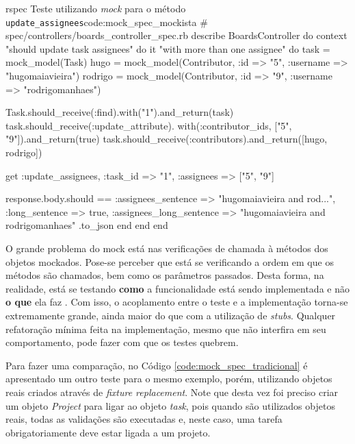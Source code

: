 \begin{mycode}{rspec}%
{Teste utilizando \textit{mock} para o método \texttt{update\_assignees}}{code:mock_spec_mockista}
# spec/controllers/boards_controller_spec.rb
describe BoardsController do
  context "should update task assignees" do
    it "with more than one assignee" do
      task = mock_model(Task)
      hugo = mock_model(Contributor, :id => "5", :username => "hugomaiavieira")
      rodrigo = mock_model(Contributor, :id => "9", :username => "rodrigomanhaes")

      Task.should_receive(:find).with("1").and_return(task)
      task.should_receive(:update_attribute).
        with(:contributor_ids, ["5", "9"]).and_return(true)
      task.should_receive(:contributors).and_return([hugo, rodrigo])

      get :update_assignees, :task_id => "1", :assignees => ["5", "9"]

      response.body.should ==
        { :assignees_sentence => "hugomaiavieira and rod...",
          :long_sentence => true,
          :assignees_long_sentence => "hugomaiavieira and rodrigomanhaes" }.to_json
    end
  end
end
\end{mycode}

O grande problema do mock está nas verificações de chamada à métodos dos objetos mockados. Pose-se perceber que está se verificando a ordem em que os métodos são chamados, bem como os parâmetros passados. Desta forma, na realidade, está se testando \textbf{como} a funcionalidade está sendo implementada e não \textbf{o que} ela faz \cite{UnitForAReason}. Com isso, o acoplamento entre o teste e a implementação torna-se extremamente grande, ainda maior do que com a utilização de \textit{stubs}. Qualquer refatoração mínima feita na implementação, mesmo que não interfira em seu comportamento, pode fazer com que os testes quebrem.

Para fazer uma comparação, no Código \ref{code:mock_spec_tradicional} é apresentado um outro teste para o mesmo exemplo, porém, utilizando objetos reais criados através de \textit{fixture replacement}. Note que desta vez foi preciso criar um objeto \textit{Project} para ligar ao objeto \textit{task}, pois quando são utilizados objetos reais, todas as validações são executadas e, neste caso, uma tarefa obrigatoriamente deve estar ligada a um projeto.

